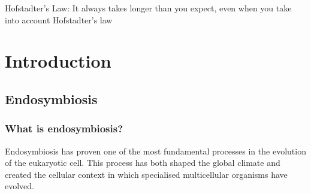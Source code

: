 \graphicspath{{chapters/1.Introduction/figures/}}

\begin{savequote}[75mm]
Hofstadter's Law: It always takes longer than you expect, even when you take into account Hofstadter's law
\end{savequote}

\chapter{Introduction}


\section{Endosymbiosis}

\subsection{What is endosymbiosis?}

Endosymbiosis has proven one of the most fundamental processes in the evolution of the
eukaryotic cell. This process has both shaped the global climate and
created the cellular context in which specialised multicellular organisms have evolved.

